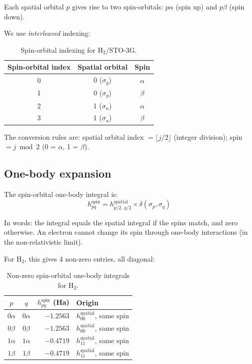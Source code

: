 \documentclass[aps,prb,preprint,longbibliography,nofootinbib]{revtex4-2}
\begin{document}
Each spatial orbital $p$ gives rise to two spin-orbitals:
$p\alpha$ (spin up) and $p\beta$ (spin down).

We use \emph{interleaved} indexing:

\begin{table}[h]
\centering
\begin{tabular}{@{}ccc@{}}
\toprule
\textbf{Spin-orbital index} & \textbf{Spatial orbital}
  & \textbf{Spin} \\
\midrule
0 & 0 ($\sigma_g$) & $\alpha$ \\
1 & 0 ($\sigma_g$) & $\beta$  \\
2 & 1 ($\sigma_u$) & $\alpha$ \\
3 & 1 ($\sigma_u$) & $\beta$  \\
\bottomrule
\end{tabular}
\caption{Spin-orbital indexing for H$_2$/STO-3G.}
\label{tab:spin-orbitals}
\end{table}

The conversion rules are:
spatial orbital index $= \lfloor j/2 \rfloor$ (integer division);
spin $= j \bmod 2$ (0 = $\alpha$, 1 = $\beta$).

\subsection{One-body expansion}

The spin-orbital one-body integral is:
\begin{equation}
h^\text{spin}_{pq} = h^\text{spatial}_{p/2,\, q/2}
                     \times \delta(\sigma_p, \sigma_q)
\end{equation}

In words: the integral equals the spatial integral if the spins match,
and zero otherwise.  An electron cannot change its spin through one-body
interactions (in the non-relativistic limit).

For H$_2$, this gives 4 non-zero entries, all diagonal:

\begin{table}[h]
\centering
\begin{tabular}{@{}ccrl@{}}
\toprule
$p$ & $q$ & $h^\text{spin}_{pq}$ (Ha) & Origin \\
\midrule
$0\alpha$ & $0\alpha$ & $-1.2563$ & $h^\text{spatial}_{00}$, same spin \\
$0\beta$  & $0\beta$  & $-1.2563$ & $h^\text{spatial}_{00}$, same spin \\
$1\alpha$ & $1\alpha$ & $-0.4719$ & $h^\text{spatial}_{11}$, same spin \\
$1\beta$  & $1\beta$  & $-0.4719$ & $h^\text{spatial}_{11}$, same spin \\
\bottomrule
\end{tabular}
\caption{Non-zero spin-orbital one-body integrals for H$_2$.}
\label{tab:spin-one-body}
\end{table}
\end{document}
